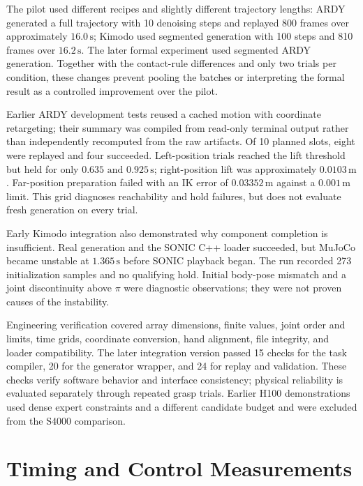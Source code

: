 \documentclass[11pt,a4paper]{article}
\begin{document}
The pilot used different recipes and slightly different trajectory lengths: ARDY generated a full trajectory with 10 denoising steps and replayed 800 frames over approximately \(16.0\,\mathrm{s}\); Kimodo used segmented generation with 100 steps and 810 frames over \(16.2\,\mathrm{s}\). The later formal experiment used segmented ARDY generation. Together with the contact-rule differences and only two trials per condition, these changes prevent pooling the batches or interpreting the formal result as a controlled improvement over the pilot.

Earlier ARDY development tests reused a cached motion with coordinate retargeting; their summary was compiled from read-only terminal output rather than independently recomputed from the raw artifacts. Of 10 planned slots, eight were replayed and four succeeded. Left-position trials reached the lift threshold but held for only \(0.635\text{ and }0.925\,\mathrm{s}\); right-position lift was approximately \(0.0103\,\mathrm{m}\). Far-position preparation failed with an IK error of \(0.03352\,\mathrm{m}\) against a \(0.001\,\mathrm{m}\) limit. This grid diagnoses reachability and hold failures, but does not evaluate fresh generation on every trial.

Early Kimodo integration also demonstrated why component completion is insufficient. Real generation and the SONIC C++ loader succeeded, but MuJoCo became unstable at \(1.365\,\mathrm{s}\) before SONIC playback began. The run recorded 273 initialization samples and no qualifying hold. Initial body-pose mismatch and a joint discontinuity above \(\pi\) were diagnostic observations; they were not proven causes of the instability.

Engineering verification covered array dimensions, finite values, joint order and limits, time grids, coordinate conversion, hand alignment, file integrity, and loader compatibility. The later integration version passed 15 checks for the task compiler, 20 for the generator wrapper, and 24 for replay and validation. These checks verify software behavior and interface consistency; physical reliability is evaluated separately through repeated grasp trials. Earlier H100 demonstrations used dense expert constraints and a different candidate budget and were excluded from the S4000 comparison.

\section*{Timing and Control Measurements}
\end{document}
